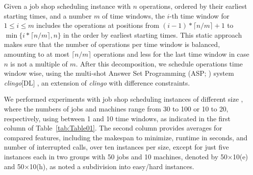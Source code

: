 \documentclass[runningheads]{llncs}
\begin{document}
Given a job shop scheduling instance with $n$ operations, ordered by their earliest starting times, and a number $m$ of time windows,
the $i$-th time window for $1\leq i\leq m$
includes the operations at positions from
$(i-1) * \lceil n/m \rceil + 1$ to
$\min\{i * \lceil n/m \rceil, n\}$ in the order
by earliest starting times.
This static approach makes sure that the number of operations per time window is balanced,
amounting to at most $\lceil n/m \rceil$ operations and less for the 
last time window in case $n$ is not a multiple of $m$.
%
%
After this decomposition, we schedule operations time window wise,
using the multi-shot Answer Set Programming (ASP; \cite{lifschitz1999answer})
system \textit{clingo}[DL] \cite{janhunen2017clingo},
an extension of \textit{clingo} \cite{gebser2019multi} with difference constraints.

We performed experiments with job shop scheduling instances of different size \cite{taillard1993benchmarks,storer1992new}, where the numbers of jobs and machines range from 30 to 100 or 10 to 20, respectively, using between 1 and 10 time windows, as indicated in the first column of Table~\ref{tab:Table01}.
The second column provides averages for compared features, including the makespan to minimize, runtime in seconds, and number of interrupted calls, over ten instances per size,
except for just five instances each in two groups
with 50 jobs and 10 machines,
denoted by 50$\times$10(e) and 50$\times$10(h),
as \cite{storer1992new} noted a subdivision into easy/hard instances.
% 
\end{document}
